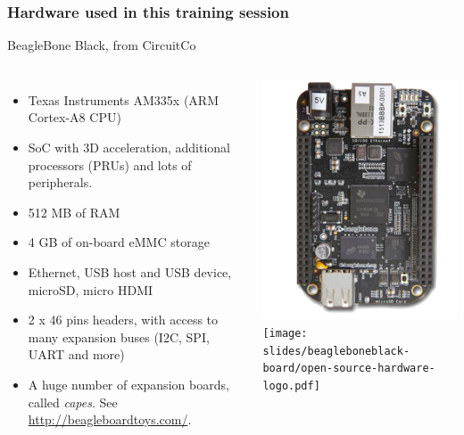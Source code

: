 \begin{frame}
\frametitle{Hardware used in this training session}
  BeagleBone Black, from CircuitCo
  \begin{columns}
    \footnotesize
    \begin{itemize}
      \item Texas Instruments AM335x (ARM Cortex-A8 CPU)
      \item SoC with 3D acceleration, additional processors
        (PRUs) and lots of peripherals.
      \item 512 MB of RAM
      \item 4 GB of on-board eMMC storage
      \item Ethernet, USB host and USB device, microSD, micro HDMI
      \item 2 x 46 pins headers, with access to many expansion buses
        (I2C, SPI, UART and more)
      \item A huge number of expansion boards, called {\em capes}.
        See \url{http://beagleboardtoys.com/}.
    \end{itemize}
    \begin{center}
      \includegraphics[width=\textwidth]{slides/beagleboneblack-board/beagleboneblack.png}\\
      \texttt{[image: slides/beagleboneblack-board/open-source-hardware-logo.pdf]}
    \end{center}
  \end{columns}
\end{frame}

